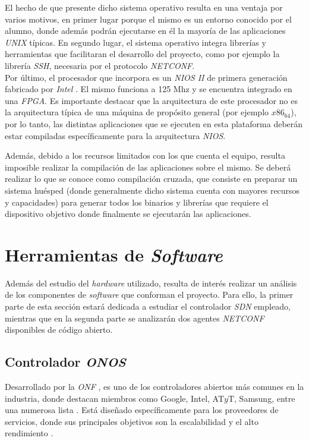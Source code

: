 El hecho de que presente dicho sistema operativo resulta en una ventaja por varios motivos, en primer lugar porque el mismo es un entorno conocido por el alumno, donde además podrán ejecutarse en él la mayoría de las aplicaciones \textit{UNIX} típicas. En segundo lugar, el sistema operativo integra librerías y herramientas que facilitaran el desarrollo del proyecto, como por ejemplo la librería \textit{SSH}, necesaria por el protocolo \textit{NETCONF}.
\\

Por último, el procesador que incorpora es un \textit{NIOS II} de primera generación fabricado por \textit{Intel} \parencite{intelaltera}. El mismo funciona a 125 Mhz y se encuentra integrado en una \textit{FPGA}. Es importante destacar que la arquitectura de este procesador no es la arquitectura típica de una máquina de propósito general (por ejemplo $x86_64$), por lo tanto, las distintas aplicaciones que se ejecuten en esta plataforma deberán estar compiladas específicamente para la arquitectura \textit{NIOS}. 

Además, debido a los recursos limitados con los que cuenta el equipo, resulta imposible realizar la compilación de las aplicaciones sobre el mismo. Se deberá realizar lo que se conoce como compilación cruzada, que consiste en preparar un sistema huésped (donde generalmente dicho sistema cuenta con mayores recursos y capacidades) para generar todos los binarios y librerías que requiere  el dispositivo objetivo donde finalmente se ejecutarán las aplicaciones.


\section{Herramientas de \textit{Software}}

Además del estudio del \textit{hardware} utilizado, resulta de interés realizar un análisis de los componentes de \textit{software} que conforman el proyecto. Para ello, la primer parte de esta sección estará dedicada a estudiar el controlador \textit{SDN} empleado, mientras que en la segunda parte se analizarán dos agentes \textit{NETCONF} disponibles de código abierto.

\subsection{Controlador \textit{ONOS}}
Desarrollado por la \textit{ONF} \parencite{onff}, es uno de los controladores abiertos más comunes en la industria, donde destacan miembros como Google, Intel, AT$y$T, Samsung, entre una numerosa lista \parencite{onffmembers}. Está diseñado específicamente para los proveedores de servicios, donde sus principales objetivos son la escalabilidad y el alto rendimiento \parencite{onffwhite}.

